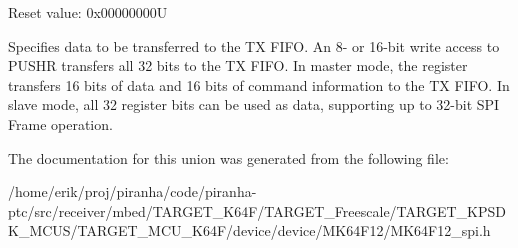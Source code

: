 Reset value\+: 0x00000000U

Specifies data to be transferred to the TX F\+I\+FO. An 8-\/ or 16-\/bit write access to P\+U\+S\+HR transfers all 32 bits to the TX F\+I\+FO. In master mode, the register transfers 16 bits of data and 16 bits of command information to the TX F\+I\+FO. In slave mode, all 32 register bits can be used as data, supporting up to 32-\/bit S\+PI Frame operation. 

The documentation for this union was generated from the following file\+:\begin{DoxyCompactItemize}
\item 
/home/erik/proj/piranha/code/piranha-\/ptc/src/receiver/mbed/\+T\+A\+R\+G\+E\+T\+\_\+\+K64\+F/\+T\+A\+R\+G\+E\+T\+\_\+\+Freescale/\+T\+A\+R\+G\+E\+T\+\_\+\+K\+P\+S\+D\+K\+\_\+\+M\+C\+U\+S/\+T\+A\+R\+G\+E\+T\+\_\+\+M\+C\+U\+\_\+\+K64\+F/device/device/\+M\+K64\+F12/M\+K64\+F12\+\_\+spi.\+h\end{DoxyCompactItemize}
